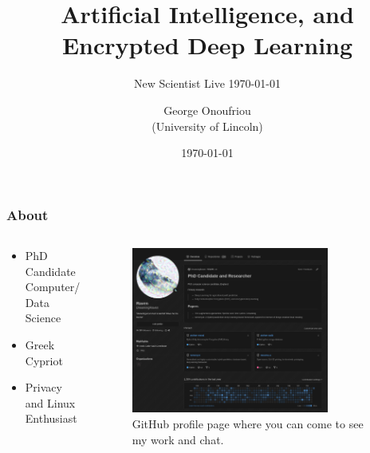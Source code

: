 \documentclass[aspectratio=169]{beamer}
\title{Artificial Intelligence, and Encrypted Deep Learning}
\subtitle{New Scientist Live \today}
\author{George Onoufriou\\(University of Lincoln)}
\date{\today}
\begin{document}

  \frame{\titlepage}

  \begin{frame}
    \frametitle{About}
    \begin{columns}
      \begin{column}{0.5\textwidth}
        \begin{itemize}
          \item PhD Candidate Computer/ Data Science
          \item Greek Cypriot
          \item Privacy and Linux Enthusiast
        \end{itemize}
      \end{column}
      \begin{column}{0.5\textwidth}
        \begin{figure}[th!]
          \centering
          \includegraphics[width=0.8\textwidth]{gh.png}
          \caption{GitHub profile page where you can come to see my work and chat.}
          \label{fig:gh}
        \end{figure}
      \end{column}
    \end{columns}
  \end{frame}
\end{document}
